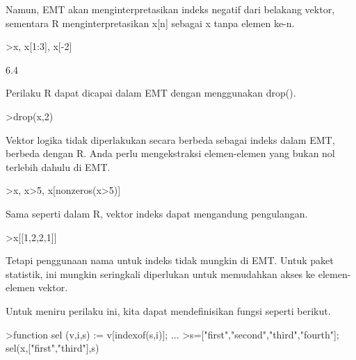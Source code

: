 \documentclass[a4paper,10pt]{article}
\begin{document}
\begin{eulernotebook}
\begin{eulercomment}
\begin{eulercomment}
\begin{eulercomment}
\begin{eulercomment}
\begin{eulercomment}
Namun, EMT akan menginterpretasikan indeks negatif dari belakang
vektor, sementara R menginterpretasikan x[n] sebagai x tanpa elemen
ke-n.
\end{eulercomment}
\begin{eulerprompt}
>x, x[1:3], x[-2]
\end{eulerprompt}
\begin{euleroutput}
  [10.4,  5.6,  3.1,  6.4,  21.7]
  [10.4,  5.6,  3.1]
  6.4
\end{euleroutput}
\begin{eulercomment}
Perilaku R dapat dicapai dalam EMT dengan menggunakan drop().
\end{eulercomment}
\begin{eulerprompt}
>drop(x,2)
\end{eulerprompt}
\begin{euleroutput}
  [10.4,  3.1,  6.4,  21.7]
\end{euleroutput}
\begin{eulercomment}
Vektor logika tidak diperlakukan secara berbeda sebagai indeks dalam
EMT, berbeda dengan R. Anda perlu mengekstraksi elemen-elemen yang
bukan nol terlebih dahulu di EMT.
\end{eulercomment}
\begin{eulerprompt}
>x, x>5, x[nonzeros(x>5)]
\end{eulerprompt}
\begin{euleroutput}
  [10.4,  5.6,  3.1,  6.4,  21.7]
  [1,  1,  0,  1,  1]
  [10.4,  5.6,  6.4,  21.7]
\end{euleroutput}
\begin{eulercomment}
Sama seperti dalam R, vektor indeks dapat mengandung pengulangan.
\end{eulercomment}
\begin{eulerprompt}
>x[[1,2,2,1]]
\end{eulerprompt}
\begin{euleroutput}
  [10.4,  5.6,  5.6,  10.4]
\end{euleroutput}
\begin{eulercomment}
Tetapi penggunaan nama untuk indeks tidak mungkin di EMT. Untuk paket
statistik, ini mungkin seringkali diperlukan untuk memudahkan akses ke
elemen-elemen vektor.

Untuk meniru perilaku ini, kita dapat mendefinisikan fungsi seperti
berikut.
\end{eulercomment}
\begin{eulerprompt}
>function sel (v,i,s) := v[indexof(s,i)]; ...
>s=["first","second","third","fourth"]; sel(x,["first","third"],s)
\end{eulerprompt}
\begin{euleroutput}
  

\end{euleroutput}
\end{eulercomment}
\end{eulercomment}
\end{eulercomment}
\end{eulercomment}
\end{eulernotebook}
\end{document}
